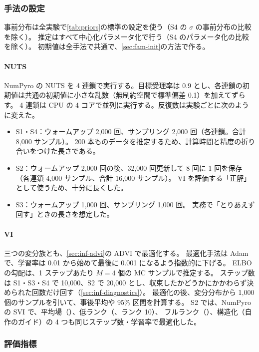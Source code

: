 \subsubsection{手法の設定}

事前分布は全実験で\cref{tab:priors}の標準の設定を使う（S4 の $\sigma$ の事前分布の比較を除く）。
推定はすべて中心化パラメータ化で行う（S4 のパラメータ化の比較を除く）。
初期値は全手法で共通で、\cref{sec:fam-init}の方法で作る。

\paragraph{NUTS}
NumPyro の NUTS を 4 連鎖で実行する。目標受理率は 0.9 とし、各連鎖の初期値は共通の初期値に小さな乱数（無制約空間で標準偏差 0.1）を加えてずらす。
4 連鎖は CPU の 4 コアで並列に実行する。反復数は実験ごとに次のように変えた。

\begin{itemize}
  \item S1・S4：ウォームアップ 2,000 回、サンプリング 2,000 回（各連鎖。合計 8,000 サンプル）。
    200 本ものデータを推定するため、計算時間と精度の折り合いをつけた長さである。
  \item S2：ウォームアップ 2,000 回の後、32,000 回更新して 8 回に 1 回を保存（各連鎖 4,000 サンプル、合計 16,000 サンプル）。
    VI を評価する「正解」として使うため、十分に長くした。
  \item S3：ウォームアップ 1,000 回、サンプリング 1,000 回。
    実務で「とりあえず回す」ときの長さを想定した。
\end{itemize}

\paragraph{VI}
三つの変分族とも、\cref{sec:inf-advi}の ADVI で最適化する。
最適化手法は Adam で、学習率は 0.01 から始めて最後に 0.001 になるよう指数的に下げる。
ELBO の勾配は、1 ステップあたり $M = 4$ 個の MC サンプルで推定する。
ステップ数は S1・S3・S4 で 10,000、S2 で 20,000 とし、収束したかどうかにかかわらず決められた回数だけ回す（\cref{sec:inf-diagnostics}）。
最適化の後、変分分布から 1,000 個のサンプルを引いて、事後平均や 95\% 区間を計算する。
S2 では、NumPyro の SVI で、平均場（）、低ランク（、ランク 10）、
フルランク（）、構造化（自作のガイド）の 4 つも同じステップ数・学習率で最適化した。

\subsubsection{評価指標}

